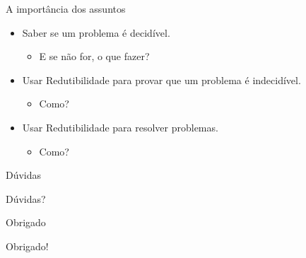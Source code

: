 \documentclass{beamer}
\begin{document}
  \begin{frame}{A importância dos assuntos}
    \begin{itemize}
      \item Saber se um problema é decidível.
        \begin{itemize}
          \item E se não for, o que fazer?\newline
        \end{itemize}

      \item Usar Redutibilidade para provar que um problema é indecidível.
        \begin{itemize}
          \item Como?\newline
        \end{itemize}

      \item Usar Redutibilidade para resolver problemas.
        \begin{itemize}
          \item Como?\newline
        \end{itemize}
    \end{itemize}
  \end{frame}

  \begin{frame}{Dúvidas}
    \Huge{\centerline{Dúvidas?}}
  \end{frame}

  \begin{frame}{Obrigado}
    \Huge{\centerline{Obrigado!}}
  \end{frame}
\end{document}
